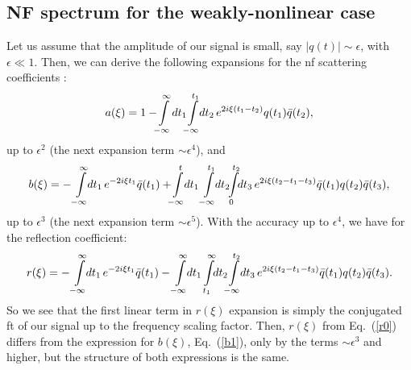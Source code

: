 \subsection{NF spectrum for the weakly-nonlinear case}
Let us assume that the amplitude of our signal is small, say $|q(t)| \sim \epsilon$, with $\epsilon \ll 1$. Then, we can derive the following expansions for the \acrshort{nf} scattering coefficients \cite{pdt13}:
\begin{equation}\label{a1}
a(\xi) = 1 - \!\! \intop_{-\infty}^{\infty} \! dt_1 \!\! \intop_{-\infty}^{t_1} \!\! dt_2 \, e^{2 i \xi (t_1-t_2)} q(t_1) \bar q(t_2),
\end{equation}
up to $\epsilon^2$ (the next expansion term $\sim \epsilon^4$), and
\begin{equation}\label{b1}
b(\xi) = -\intop_{-\infty}^{\infty} \!\! dt_1 \, e^{- 2 i \xi t_1} \bar q(t_1) +  \!\! \intop_{-\infty}^{t} \!\! dt_1 \intop_{-\infty}^{t_1} \! \!dt_2 \!\! \intop_{0}^{t_2}\!\!  dt_3 \, e^{2 i \xi (t_2-t_1-t_3)} \bar q(t_1) q(t_2) \bar q(t_3),
\end{equation}
up to $\epsilon^3$  (the next expansion term $\sim \epsilon^5$). With the accuracy up to $\epsilon^4$, we have for the reflection coefficient:
\begin{equation}\label{r0}
r(\xi) = - \intop_{-\infty}^{\infty} \!\! dt_1 \, e^{- 2 i \xi t_1} \bar q(t_1) -  \intop_{-\infty}^{\infty} \!\! dt_1 \intop_{t_1}^{\infty} \! \!dt_2 \!\! \intop_{-\infty}^{t_2}\!\!  dt_3  \, e^{2 i \xi (t_2-t_1-t_3)} \bar q(t_1) q(t_2) \bar q(t_3) .
\end{equation}
So we see that the first linear term in $r(\xi)$ expansion is simply the conjugated \acrshort{ft} of our signal up to the frequency scaling factor. Then, $r(\xi)$ from Eq.~(\ref{r0}) differs from the expression for $b(\xi)$, Eq.~(\ref{b1}), only by the terms $\sim \epsilon^3$ and higher, but the structure of both expressions is the same.